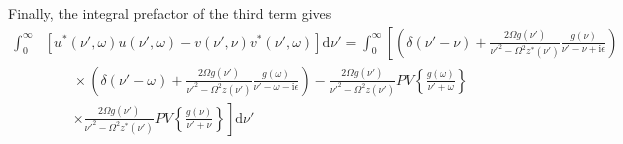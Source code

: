 Finally, the integral prefactor of the third term gives
\begin{equation}\label{eq:uu-minus-vv-integral}
\begin{split}
\int_0^\infty&\left[u^*(\nu',\omega)u(\nu',\omega) - v(\nu',\nu)v^*(\nu',\omega)\right]\mathrm{d}\nu' = \int_0^\infty\left[\left(\delta(\nu' - \nu) + \frac{2\Omega g(\nu')}{\nu'^2 - \Omega^2z^*(\nu')}\frac{g(\nu)}{\nu' - \nu + \mathrm{i}\epsilon}\right)\right.\\
&\qquad\times\left(\delta(\nu' - \omega) + \frac{2\Omega g(\nu')}{\nu'^2 - \Omega^2z(\nu')}\frac{g(\omega)}{\nu' - \omega - \mathrm{i}\epsilon}\right) - \frac{2\Omega g(\nu')}{\nu'^2 - \Omega^2z(\nu')}PV\left\{\frac{g(\omega)}{\nu' + \omega}\right\}\\
&\qquad\left.\times\frac{2\Omega g(\nu')}{\nu'^2 - \Omega^2z^*(\nu')}PV\left\{\frac{g(\nu)}{\nu' + \nu}\right\}\right]\mathrm{d}\nu'\\

\end{split}
\end{equation}
